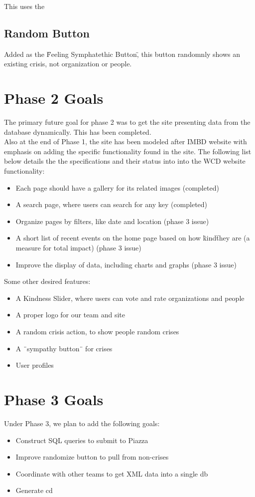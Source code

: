 \documentclass[12pt]{report}
\begin{document}
This uses the

\subsection*{Random Button}
\hfill 

Added as the \"Feeling Symphatethic Button\", this button randomnly shows an existing crisis, not organization or people. 

\newpage
\section*{Phase 2 Goals}
\hfill


The primary future goal for phase 2 was to get the site presenting data from the database dynamically. This has been completed.\\ 


Also at the end of Phase 1, the site has been modeled after IMBD website with emphasis on adding the specific functionality found in the site. The following list below details the the specifications and their status into into the WCD website functionality:
\begin{itemize}
\item Each page should have a gallery for its related images (completed)
\item A search page, where users can search for any key (completed)
\item Organize pages by filters, like date and location (phase 3 issue)
\item A short list of recent events on the home page based on how \"kind\" they are (a measure for total impact) (phase 3 issue)
\item Improve the display of data, including charts and graphs (phase 3 issue)
\end{itemize}

\hfill \newline
Some other desired features:
\begin{itemize}
\item A Kindness Slider, where users can vote and rate organizations and people
\item A proper logo for our team and site
\item A random crisis action, to show people random crises
\item A ¨sympathy button¨ for crises
\item User profiles
\end{itemize}


\newpage
\section*{Phase 3 Goals}
\hfill

Under Phase 3, we plan to add the following goals:
\begin{itemize}
\item Construct SQL queries to submit to Piazza
\item Improve randomize button to pull from non-crises
\item Coordinate with other teams to get XML data into a single db
\item Generate cd 
\end{itemize}
\end{document}
